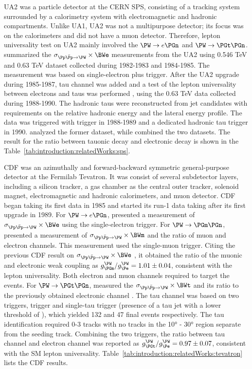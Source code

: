 UA2 was a particle detector at the CERN SPS, consisting of a tracking system surrounded by a calorimetry system with electromagnetic and hadronic compartments. Unlike UA1, UA2 was not a multipurpose detector; its focus was on the calorimeters and did not have a muon detector. Therefore, lepton universality test on UA2 mainly involved the $\PW \to e\PGn$ and $\PW \to \PGt \PGn$. \cite{appel1986measurement} summarized the $\sigma_{\Pp\bar{\Pp}\to \PW} \times \BWe$ measurements from the UA2 using 0.546 TeV and 0.63 TeV dataset collected during 1982-1983 and 1984-1985. The measurement was based on single-electron plus \MET trigger. After the UA2 upgrade during 1985-1987, tau channel was added and a test of the lepton universality between electrons and taus was performed \cite{Alitti:1991eh, Alitti:1992hv}, using the 0.63 TeV data collected during 1988-1990. The hadronic taus were reconstructed from jet candidates with requirements on the relative hadronic energy and the lateral energy profile. The data was triggered with \MET trigger in 1988-1989 and a dedicated hadronic tau trigger in 1990. \cite{Alitti:1991eh} analyzed the former dataset, while \cite{Alitti:1992hv} combined the two datasets. The result \cite{Alitti:1992hv} for the ratio between tauonic decay and electronic decay is shown in the Table~\ref{tab:introduction:relatedWorks:sps}. 






CDF was an azimuthally and forward-backward symmetric general-purpose detector at the Fermilab Tevatron. It was consist of several subdetector layers, including a silicon tracker, a gas chamber as the central outer tracker, solenoid magnet, electromagnetic and hadronic calorimeters, and muon detector. CDF began taking its first data in 1985 and started its run-1 data taking after its first upgrade in 1989. For $\PW \to e  \PGn$, \cite{Abe:1990sd} presented a measurement of $\sigma_{\Pp\bar{\Pp}\to \PW} \times \BWe$ using the single-electron trigger. For $\PW \to \PGm  \PGn$, \cite{Abe:1992ys} presented a measurement of $\sigma_{\Pp\bar{\Pp}\to \PW} \times \BWm$ and the ratio of muon and electron channels. This measurement used the single-muon trigger. Citing the previous CDF result on $\sigma_{\Pp\bar{\Pp}\to \PW} \times \BWe$ \cite{Abe:1990sd}, it obtained the ratio of the muonic and electronic weak coupling as $g^\PW_\PGm/g^\PW_\Pe=1.01\pm0.04$, consistent with the lepton universality. Both electron and muon channels required \MET to target the \wjets events.  For $\PW \to \PGt \PGn$, \cite{Abe:1991fb} measured the $\sigma_{\Pp\bar{\Pp}\to \PW} \times \BWt$ and its ratio to the previously obtained electronic channel \cite{Abe:1990sd}. The tau channel was based on two triggers, \MET trigger and single-tau trigger (presence of a tau jet with a lower threshold of \MET), which yielded 132 and 47 final events respectively. The tau identification required 0-3 tracks with no tracks in the \ang{10} - \ang{30} region separate from the seeding track. Combining the two triggers, the ratio between tau channel and electron channel was reported as $g^\PW_\PGt/g^\PW_\Pe=0.97\pm0.07$, consistent with the SM lepton universality. Table~\ref{tab:introduction:relatedWorks:tevatron} lists the CDF results.



